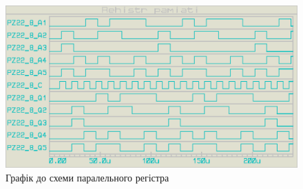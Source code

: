 \documentclass{article}
\begin{document}
\begin{normalsize}
	\begin{figure}[H]
		\centering
		\includegraphics[scale=0.25]{g1}	
		\caption{Графік до схеми паралельного регістра}
	\end{figure}

	\begin{figure}[H]
		\centering
		\hspace{5px}
		

\end{figure}
\end{normalsize}
\end{document}
